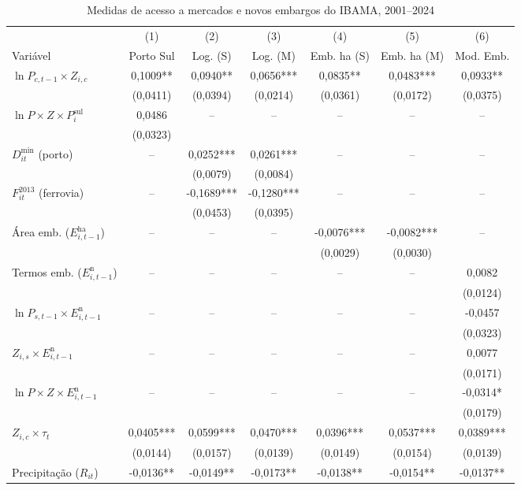 \begin{table}[htbp]
\centering
\footnotesize
\setlength{\tabcolsep}{2.4pt}
\captionstyle{\centering}
\normalcaption
\caption{Medidas de acesso a mercados e novos embargos do IBAMA, 2001--2024}
\label{tab:h1-logistica-embargos}
\begin{tabular}{lcccccc}
\toprule
 & (1) & (2) & (3) & (4) & (5) & (6) \\
Variável & Porto Sul & Log. (S) & Log. (M) & Emb. ha (S) & Emb. ha (M) & Mod. Emb. \\
\midrule
$\ln P_{c,t-1} \times Z_{i,c}$ & 0,1009** & 0,0940** & 0,0656*** & 0,0835** & 0,0483*** & 0,0933** \\
 & (0,0411) & (0,0394) & (0,0214) & (0,0361) & (0,0172) & (0,0375) \\
$\ln P \times Z \times P_i^{\text{sul}}$ & 0,0486 & -- & -- & -- & -- & -- \\
 & (0,0323) &  &  &  &  &  \\
$D_{it}^{\text{min}}$ (porto) & -- & 0,0252*** & 0,0261*** & -- & -- & -- \\
 &  & (0,0079) & (0,0084) &  &  &  \\
$F_{it}^{2013}$ (ferrovia) & -- & -0,1689*** & -0,1280*** & -- & -- & -- \\
 &  & (0,0453) & (0,0395) &  &  &  \\
Área emb. ($E_{i,t-1}^{\text{ha}}$) & -- & -- & -- & -0,0076*** & -0,0082*** & -- \\
 &  &  &  & (0,0029) & (0,0030) &  \\
Termos emb. ($E_{i,t-1}^{\text{n}}$) & -- & -- & -- & -- & -- & 0,0082 \\
 &  &  &  &  &  & (0,0124) \\
$\ln P_{s,t-1} \times E_{i,t-1}^{\text{n}}$ & -- & -- & -- & -- & -- & -0,0457 \\
 &  &  &  &  &  & (0,0323) \\
$Z_{i,s} \times E_{i,t-1}^{\text{n}}$ & -- & -- & -- & -- & -- & 0,0077 \\
 &  &  &  &  &  & (0,0171) \\
$\ln P \times Z \times E_{i,t-1}^{\text{n}}$ & -- & -- & -- & -- & -- & -0,0314* \\
 &  &  &  &  &  & (0,0179) \\
$Z_{i,c} \times \tau_t$ & 0,0405*** & 0,0599*** & 0,0470*** & 0,0396*** & 0,0537*** & 0,0389*** \\
 & (0,0144) & (0,0157) & (0,0139) & (0,0149) & (0,0154) & (0,0139) \\
Precipitação ($R_{it}$) & -0,0136** & -0,0149** & -0,0173** & -0,0138** & -0,0154** & -0,0137** \\

\end{tabular}
\end{table}
